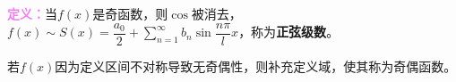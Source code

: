 \textcolor{violet}{\textbf{定义：}}当$f(x)$是奇函数，则$\cos$被消去，$f(x)\sim S(x)=\dfrac{a_0}{2}+\sum\limits_{n=1}^\infty b_n\sin\dfrac{n\pi}{l}x$，称为\textbf{正弦级数}。

若$f(x)$因为定义区间不对称导致无奇偶性，则补充定义域，使其称为奇偶函数。


%
